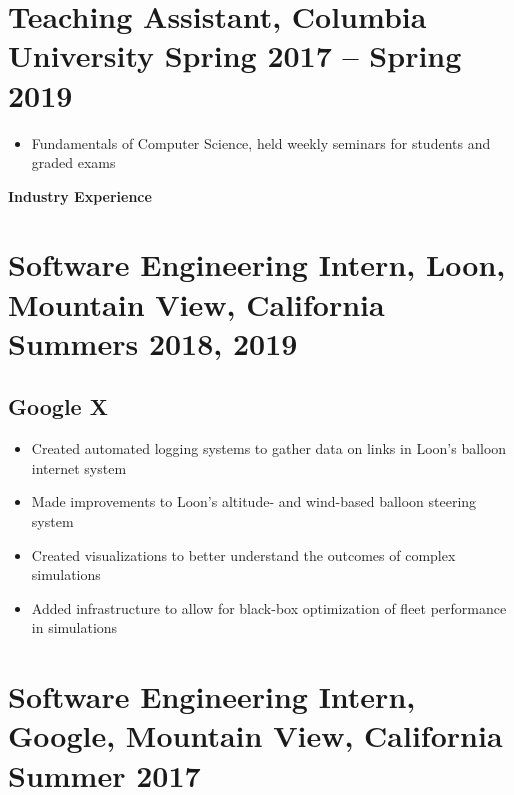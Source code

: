 \documentclass{article}
\begin{document}
\section*{\textbf{Teaching Assistant, Columbia University \hfill	Spring 2017 -- Spring 2019 }}
\begin{itemize}
    \item Fundamentals of Computer Science, held weekly seminars for students and graded exams
\end{itemize}


\noindent
\large{\textbf{Industry Experience}}
\section*{\textbf{Software Engineering Intern, Loon, Mountain View, California \hfill Summers 2018, 2019}}
\subsection*{Google X}
\begin{itemize}[noitemsep]
    \item Created automated logging systems to gather data on links in Loon’s balloon internet system
    \item Made improvements to Loon's altitude- and wind-based balloon steering system
    \item Created visualizations to better understand the outcomes of complex simulations
    \item Added infrastructure to allow for black-box optimization of fleet performance in simulations
\end{itemize}

\section*{\textbf{Software Engineering Intern, Google, Mountain View, California \hfill Summer 2017}}
\end{document}
